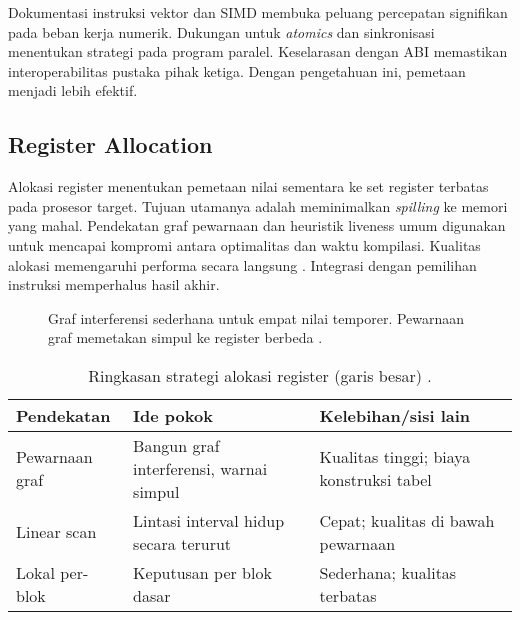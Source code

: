 \documentclass[../main.tex]{subfiles}
\begin{document}
Dokumentasi instruksi vektor dan SIMD membuka peluang percepatan signifikan pada beban kerja numerik. Dukungan untuk \emph{atomics} dan sinkronisasi menentukan strategi pada program paralel. Keselarasan dengan ABI memastikan interoperabilitas pustaka pihak ketiga. Dengan pengetahuan ini, pemetaan menjadi lebih efektif.

\subsection{Register Allocation}
Alokasi register menentukan pemetaan nilai sementara ke set register terbatas pada prosesor target. Tujuan utamanya adalah meminimalkan \emph{spilling} ke memori yang mahal. Pendekatan graf pewarnaan dan heuristik liveness umum digunakan untuk mencapai kompromi antara optimalitas dan waktu kompilasi. Kualitas alokasi memengaruhi performa secara langsung \citep{WikiRegisterAllocation}. Integrasi dengan pemilihan instruksi memperhalus hasil akhir.

\begin{figure}[t]
  \centering
  \caption{Graf interferensi sederhana untuk empat nilai temporer. Pewarnaan graf memetakan simpul ke register berbeda \citep{WikiGraphColoring,WikiRegisterAllocation}.}
  \label{fig:interference-graph}
\end{figure}

\begin{table}[t]
  \centering
  \caption{Ringkasan strategi alokasi register (garis besar) \citep{WikiRegisterAllocation}.}
  \label{tab:ra-strategies}
  \begin{tabular}{@{}lll@{}}
    \toprule
    Pendekatan & Ide pokok & Kelebihan/sisi lain \\
    \midrule
    Pewarnaan graf & Bangun graf interferensi, warnai simpul & Kualitas tinggi; biaya konstruksi tabel \\
    Linear scan & Lintasi interval hidup secara terurut & Cepat; kualitas di bawah pewarnaan \\
    Lokal per-blok & Keputusan per blok dasar & Sederhana; kualitas terbatas \\
    \bottomrule
  \end{tabular}
\end{table}
\end{document}
